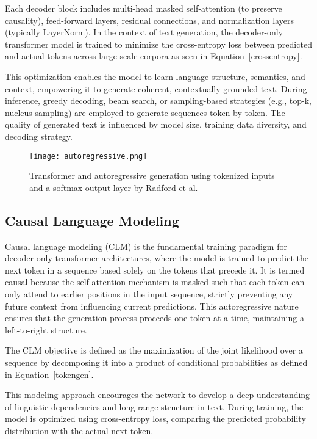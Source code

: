 Each decoder block includes multi-head masked self-attention (to preserve causality),
feed-forward layers, residual connections, and normalization layers (typically LayerNorm).
In the context of text generation, the decoder-only transformer model is trained to minimize
the cross-entropy loss between predicted and actual tokens across large-scale corpora
as seen in Equation~\ref{crossentropy}.

This optimization enables the model to learn language structure, semantics, and context,
empowering it to generate coherent, contextually grounded text. During inference,
greedy decoding, beam search, or sampling-based strategies (e.g., top-k, nucleus sampling)
are employed to generate sequences token by token. The quality of generated text
is influenced by model size, training data diversity, and decoding strategy.

\begin{figure}[H]
  \centering
  \texttt{[image: autoregressive.png]}
  \caption{Transformer and autoregressive generation using tokenized inputs and a softmax output layer by Radford et al. \cite{radford2018improving}}
\end{figure}

\subsection{Causal Language Modeling}

Causal language modeling (CLM) is the fundamental training paradigm for decoder-only
transformer architectures, where the model is trained to predict the next token in a
sequence based solely on the tokens that precede it. It is termed causal because the self-attention
mechanism is masked such that each token can only attend to earlier positions
in the input sequence, strictly preventing any future context from influencing current
predictions. This autoregressive nature ensures that the generation process proceeds one
token at a time, maintaining a left-to-right structure.

The CLM objective is defined as the maximization of the joint likelihood over a sequence
by decomposing it into a product of conditional probabilities as defined in Equation~\ref{tokengen}.

This modeling approach encourages the network to develop a deep understanding of
linguistic dependencies and long-range structure in text. During training, the model is
optimized using cross-entropy loss, comparing the predicted probability distribution with
the actual next token.

